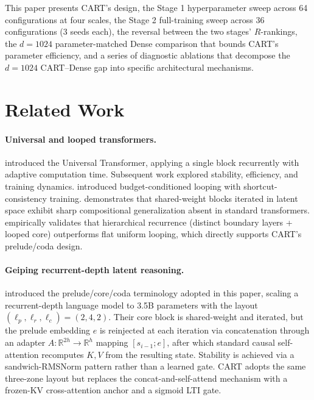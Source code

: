 \documentclass{article}
\newcommand{\cart}{\textsc{CART}}
\begin{document}
This paper presents \cart{}'s design, the Stage 1 hyperparameter sweep across 64 configurations at four scales, the Stage 2 full-training sweep across 36 configurations (3 seeds each), the reversal between the two stages' $R$-rankings, the $d{=}1024$ parameter-matched Dense comparison that bounds \cart{}'s parameter efficiency, and a series of diagnostic ablations that decompose the $d{=}1024$ \cart{}--Dense gap into specific architectural mechanisms.

\section{Related Work}
\label{sec:related}

\paragraph{Universal and looped transformers.}
\citet{dehghani2018universal} introduced the Universal Transformer, applying a single block recurrently with adaptive computation time. Subsequent work explored stability, efficiency, and training dynamics. \citet{jeddi2026loopformer} introduced budget-conditioned looping with shortcut-consistency training. \citet{chen2026deeper} demonstrates that shared-weight blocks iterated in latent space exhibit sharp compositional generalization absent in standard transformers. \citet{han2026hierarchical} empirically validates that hierarchical recurrence (distinct boundary layers + looped core) outperforms flat uniform looping, which directly supports \cart{}'s prelude/coda design.

\paragraph{Geiping recurrent-depth latent reasoning.}
\citet{geiping2025latent} introduced the prelude/core/coda terminology adopted in this paper, scaling a recurrent-depth language model to 3.5B parameters with the layout $(\ell_p, \ell_r, \ell_c) = (2, 4, 2)$. Their core block is shared-weight and iterated, but the prelude embedding $e$ is reinjected at each iteration via concatenation through an adapter $A: \mathbb{R}^{2h} \to \mathbb{R}^h$ mapping $[s_{i-1}; e]$, after which standard causal self-attention recomputes $K, V$ from the resulting state. Stability is achieved via a sandwich-RMSNorm pattern rather than a learned gate. \cart{} adopts the same three-zone layout but replaces the concat-and-self-attend mechanism with a frozen-KV cross-attention anchor and a sigmoid LTI gate.
\end{document}
